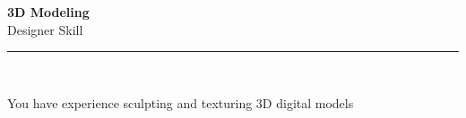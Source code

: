 \documentclass[11pt,a4paper]{memoir}
\begin{document}
    \begin{Spacing}{0.75}%
        \noindent
        \Large
        \textbf{3D Modeling}\\[3pt]
        \scriptsize\color{gray}Designer Skill\\ 
        \rule{\textwidth}{.3mm}\\
        
        \vspace{3mm}
        \noindent
        \begin{minipage}[t]{53mm}
            \begin{flushleft}
            {
                \normalsize
                \begin{Spacing}{1}%
                \color{black}\textrm{You have experience sculpting and texturing 3D digital models}\\
                \end{Spacing}
            }
            \end{flushleft}
        \end{minipage}

        \vspace{5mm}
        \noindent
        \begin{minipage}[t]{53mm}
            \begin{flushleft}
            {
                \normalsize
                \begin{Spacing}{1}%
                \color{gray}\textit{}\\
                \end{Spacing}
            }
            \end{flushleft}
        \end{minipage}
    \end{Spacing}
    \clearpage
\end{document}
